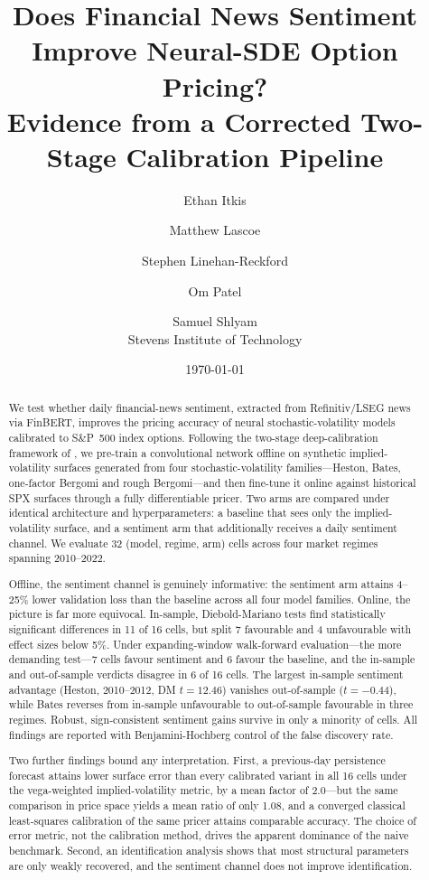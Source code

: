 \documentclass[11pt,a4paper]{article}
\title{Does Financial News Sentiment Improve Neural-SDE Option Pricing?\\
       Evidence from a Corrected Two-Stage Calibration Pipeline}
\author{Ethan Itkis \and Matthew Lascoe \and Stephen Linehan-Reckford \and
        Om Patel \and Samuel Shlyam\\[4pt]
        \small Stevens Institute of Technology}
\date{\today}
\begin{document}
\maketitle

\begin{abstract}
We test whether daily financial-news sentiment, extracted from Refinitiv/LSEG
news via FinBERT, improves the pricing accuracy of neural stochastic-volatility
models calibrated to S\&P~500 index options. Following the two-stage
deep-calibration framework of \citet{horvath2021}, we pre-train a convolutional
network offline on synthetic implied-volatility surfaces generated from four
stochastic-volatility families---Heston, Bates, one-factor Bergomi and rough
Bergomi---and then fine-tune it online against historical SPX surfaces through a
fully differentiable pricer. Two arms are compared under identical architecture
and hyperparameters: a baseline that sees only the implied-volatility surface,
and a sentiment arm that additionally receives a daily sentiment channel. We
evaluate 32 (model, regime, arm) cells across four market regimes spanning
2010--2022.

Offline, the sentiment channel is genuinely informative: the sentiment arm
attains 4--25\% lower validation loss than the baseline across all four model
families. Online, the picture is far more equivocal. In-sample,
Diebold-Mariano tests find statistically significant differences in 11 of 16
cells, but split 7 favourable and 4 unfavourable with effect sizes below 5\%.
Under expanding-window walk-forward evaluation---the more demanding test---7
cells favour sentiment and 6 favour the baseline, and the in-sample and
out-of-sample verdicts disagree in 6 of 16 cells. The largest in-sample
sentiment advantage (Heston, 2010--2012, DM $t=12.46$) vanishes out-of-sample
($t=-0.44$), while Bates reverses from in-sample unfavourable to out-of-sample
favourable in three regimes. Robust, sign-consistent sentiment gains survive in
only a minority of cells. All findings are reported with Benjamini-Hochberg
control of the false discovery rate.

Two further findings bound any interpretation. First, a previous-day persistence
forecast attains lower surface error than every calibrated variant in all 16
cells under the vega-weighted implied-volatility metric, by a mean factor of
2.0---but the same comparison in price space yields a mean ratio of only 1.08,
and a converged classical least-squares calibration of the same pricer attains
comparable accuracy. The choice of error metric, not the calibration method,
drives the apparent dominance of the naive benchmark. Second, an identification
analysis shows that most structural parameters are only weakly recovered, and
the sentiment channel does not improve identification.
\end{abstract}
\end{document}
